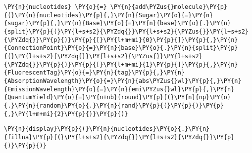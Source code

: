 \begin{tcolorbox}[breakable, size=fbox, boxrule=1pt, pad at break*=1mm,colback=cellbackground, colframe=cellborder]
\begin{Verbatim}[commandchars=\\\{\}]
            \PY{n}{nucleotides} \PY{o}{=} \PY{n}{add\PYZus{}molecule}\PY{p}{(}\PY{n}{nucleotides}\PY{p}{,}\PY{n}{Sugar}\PY{o}{=}\PY{n}{sugar}\PY{p}{,}\PY{n}{Base}\PY{o}{=}\PY{n}{base}\PY{o}{.}\PY{n}{split}\PY{p}{(}\PY{l+s+s2}{\PYZdq{}}\PY{l+s+s2}{\PYZus{}}\PY{l+s+s2}{\PYZdq{}}\PY{p}{)}\PY{p}{[}\PY{l+m+mi}{0}\PY{p}{]}\PY{p}{,}\PY{n}{ConnectionPoint}\PY{o}{=}\PY{n}{base}\PY{o}{.}\PY{n}{split}\PY{p}{(}\PY{l+s+s2}{\PYZdq{}}\PY{l+s+s2}{\PYZus{}}\PY{l+s+s2}{\PYZdq{}}\PY{p}{)}\PY{p}{[}\PY{l+m+mi}{1}\PY{p}{]}\PY{p}{,}\PY{n}{FluorescentTag}\PY{o}{=}\PY{n}{tag}\PY{p}{,}\PY{n}{AbsorptionWavelength}\PY{o}{=}\PY{n}{abs\PYZus{}wl}\PY{p}{,}\PY{n}{EmissionWavelength}\PY{o}{=}\PY{n}{emi\PYZus{}wl}\PY{p}{,}\PY{n}{QuantumYield}\PY{o}{=}\PY{n+nb}{round}\PY{p}{(}\PY{n}{np}\PY{o}{.}\PY{n}{random}\PY{o}{.}\PY{n}{rand}\PY{p}{(}\PY{p}{)}\PY{p}{,}\PY{l+m+mi}{2}\PY{p}{)}\PY{p}{)}
\end{Verbatim}
\end{tcolorbox}

    \begin{tcolorbox}[breakable, size=fbox, boxrule=1pt, pad at break*=1mm,colback=cellbackground, colframe=cellborder]
\begin{Verbatim}[commandchars=\\\{\}]
\PY{n}{display}\PY{p}{(}\PY{n}{nucleotides}\PY{o}{.}\PY{n}{fillna}\PY{p}{(}\PY{l+s+s2}{\PYZdq{}}\PY{l+s+s2}{\PYZdq{}}\PY{p}{)}\PY{p}{)}
\end{Verbatim}
\end{tcolorbox}

